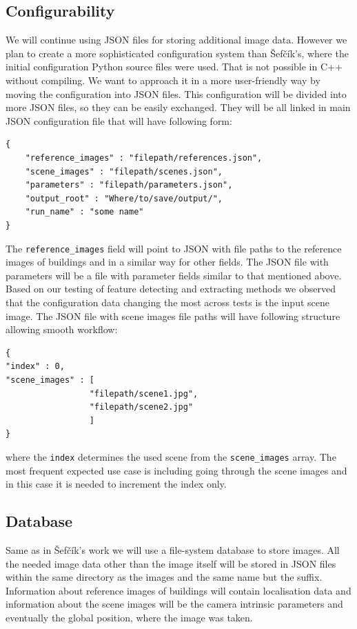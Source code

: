 \documentclass[thesis=B,english]{FITthesis}[2019/12/23]
\begin{document}
        \subsection{Configurability}
        We will continue using JSON files for storing additional image data. However we plan to create a more sophisticated configuration system than Šefčík’s, where the initial configuration Python source files were used. That is not possible in C++ without compiling. We want to approach it in a more user-friendly way by moving the configuration into JSON files. This configuration will be divided into more JSON files, so they can be easily exchanged. They will be all linked in main JSON configuration file that will have following form:
        \begin{verbatim}
{
    "reference_images" : "filepath/references.json",
    "scene_images" : "filepath/scenes.json",
    "parameters" : "filepath/parameters.json",
    "output_root" : "Where/to/save/output/",
    "run_name" : "some name"
}
        \end{verbatim}
        The \texttt{reference\_images} field will point to JSON with file paths to the reference images of buildings and in a similar way for other fields. The JSON file with parameters will be a file with parameter fields similar to that mentioned above. Based on our testing of feature detecting and extracting methods we observed that the configuration data changing the most across tests is the input scene image. The JSON file with scene images file paths will have following structure allowing smooth workflow:
        
        \begin{verbatim}
{
"index" : 0,
"scene_images" : [
                 "filepath/scene1.jpg",
                 "filepath/scene2.jpg"
                 ]
}
        \end{verbatim}
        where the \texttt{index} determines the used scene from the \texttt{scene\_images} array. The most frequent expected use case is including going through the scene images and in this case it is needed to increment the index only.
        
        \subsection{Database}
        Same as in Šefčík's work we will use a file-system database to store images. All the needed image data other than the image itself will be stored in JSON files within the same directory as the images and the same name but the suffix. Information about reference images of buildings will contain localisation data and information about the scene images will be the camera intrinsic parameters and eventually the global position, where the image was taken.
        
\end{document}
